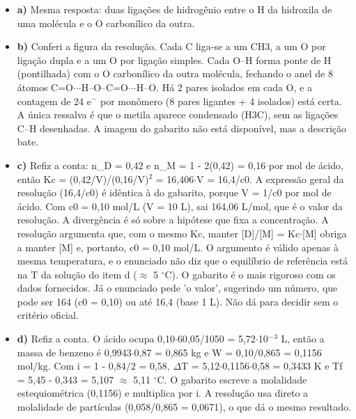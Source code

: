 \documentclass{article}%
\begin{document}
\begin{itemize}%
\item%
\textbf{a)} Mesma resposta: duas ligações de hidrogênio entre o H da hidroxila de uma molécula e o O carbonílico da outra.%
\item%
\textbf{b)} Conferi a figura da resolução. Cada C liga{-}se a um CH3, a um O por ligação dupla e a um O por ligação simples. Cada O--H forma ponte de H (pontilhada) com o O carbonílico da outra molécula, fechando o anel de 8 átomos C=O$\cdot$$\cdot$$\cdot$H--O--C=O$\cdot$$\cdot$$\cdot$H--O. Há 2 pares isolados em cada O, e a contagem de 24 e$^{-}$ por monômero (8 pares ligantes + 4 isolados) está certa. A única ressalva é que o metila aparece condensado (H3C), sem as ligações C--H desenhadas. A imagem do gabarito não está disponível, mas a descrição bate.%
\item%
\textbf{c)} Refiz a conta: n\_D = 0,42 e n\_M = 1 - 2(0,42) = 0,16 por mol de ácido, então Kc = (0,42/V)/(0,16/V)$^2$ = 16,406$\cdot$V = 16,4/c0. A expressão geral da resolução (16,4/c0) é idêntica à do gabarito, porque V = 1/c0 por mol de ácido. Com c0 = 0,10 mol/L (V = 10 L), sai 164,06 L/mol, que é o valor da resolução. A divergência é só sobre a hipótese que fixa a concentração. A resolução argumenta que, com o mesmo Kc, manter {[}D{]}/{[}M{]} = Kc$\cdot${[}M{]} obriga a manter {[}M{]} e, portanto, c0 = 0,10 mol/L. O argumento é válido apenas à mesma temperatura, e o enunciado não diz que o equilíbrio de referência está na T da solução do item d ($\approx$ 5 $^\circ$C). O gabarito é o mais rigoroso com os dados fornecidos. Já o enunciado pede 'o valor', sugerindo um número, que pode ser 164 (c0 = 0,10) ou até 16,4 (base 1 L). Não dá para decidir sem o critério oficial.%
\item%
\textbf{d)} Refiz a conta. O ácido ocupa 0,10$\cdot$60,05/1050 = 5,72$\cdot$10$^{-}$$^3$ L, então a massa de benzeno é 0,9943$\cdot$0,87 = 0,865 kg e W = 0,10/0,865 = 0,1156 mol/kg. Com i = 1 - 0,84/2 = 0,58, $\Delta$T = 5,12$\cdot$0,1156$\cdot$0,58 = 0,3433 K e Tf = 5,45 - 0,343 = 5,107 $\approx$ 5,11 $^\circ$C. O gabarito escreve a molalidade estequiométrica (0,1156) e multiplica por i. A resolução usa direto a molalidade de partículas (0,058/0,865 = 0,0671), o que dá o mesmo resultado.%
\end{itemize}%
\end{document}
